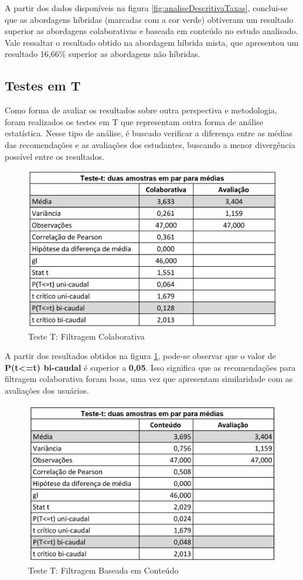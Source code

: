 A partir dos dados disponíveis na figura \ref{fig:analiseDescritivaTaxas}, conclui-se que as abordagens híbridas (marcadas com a cor verde) obtiveram um resultado superior as abordagens colaborativas e baseada em conteúdo no estudo analisado. Vale ressaltar o resultado obtido na abordagem híbrida mista, que apresentou um resultado 16,66\% superior as abordagens não híbridas.

\subsection{Testes em T}

Como forma de avaliar os resultados sobre outra perspectiva e metodologia, foram realizados os testes em T que representam outra forma de análise estatística. Nesse tipo de análise, é buscado verificar a diferença entre as médias das recomendações e as avaliações dos estudantes, buscando a menor divergência possível entre os resultados.

\begin{figure}[H]
	\centering
	\includegraphics[width=.7\linewidth]{imagens/testeTColaborativa.jpg}
	\caption[Teste T: Filtragem Colaborativa]{Teste T: Filtragem Colaborativa}
    \label{fig:testeTColaborativa}
\end{figure}

A partir dos resultados obtidos na figura \ref{fig:testeTColaborativa}, pode-se observar que o valor de \textbf{P(t<=t) bi-caudal} é superior a \textbf{0,05}. Isso significa que as recomendações para filtragem colaborativa foram boas, uma vez que apresentam similaridade com as avaliações dos usuários.

\begin{figure}[H]
	\centering
	\includegraphics[width=.7\linewidth]{imagens/testeTConteudo.jpg}
	\caption[Teste T: Filtragem Baseada em Conteúdo]{Teste T: Filtragem Baseada em Conteúdo}
    \label{fig:testeTConteudo}
\end{figure}


